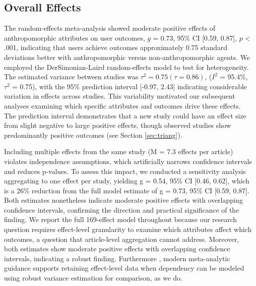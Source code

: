 \documentclass[manuscript,screen,review,anonymous]{acmart}
\DeclareRobustCommand{\change}[1]{%
    \textcolor{changeblue}{#1}%
  }
\DeclareRobustCommand{\change}[1]{#1}
\begin{document}
\subsection{Overall Effects}
The random-effects meta-analysis showed moderate positive effects of anthropomorphic attributes on user outcomes, $g$ = 0.73, 95\% CI [0.59, 0.87], $p$ < .001, indicating that users achieve outcomes approximately 0.75 standard deviations better with anthropomorphic 
versus non-anthropomorphic agents.
We employed the DerSimonian-Laird random-effects model \citep{dersimonian1986meta} to test for heterogeneity. The estimated variance between studies was $\tau^2 = 0.75 (\tau = 0.86)$, ($I^2$ = 95.4\%, $\tau^2$ = 0.75), with the 95\% prediction interval [-0.97, 2.43] indicating considerable variation in effects across studies. This variability motivated our subsequent analyses examining which specific attributes and outcomes drive these 
effects. The prediction interval demonstrates that a new study could have an effect size from slight negative to large positive effects, though observed studies show predominantly positive outcomes (see Section \ref{sec:triang}). 

\change{Including multiple effects from the same study (M = 7.3 effects per article) violates independence assumptions, which artificially narrows confidence intervals and reduces p-values. To assess this impact, we conducted a sensitivity analysis aggregating to one effect per study, yielding
g = 0.54, 95\% CI [0.46, 0.62], which is a 26\% reduction from the full model estimate of
g = 0.73, 95\% CI [0.59, 0.87]. Both estimates nonetheless indicate moderate positive effects with overlapping confidence intervals, confirming the direction and practical significance of the finding. We report the full 169-effect model throughout because our research question requires effect-level granularity to examine which attributes affect which outcomes, a question that article-level aggregation cannot address. Moreover,} both estimates show moderate positive effects with overlapping confidence intervals, indicating a robust finding. \change{Furthermore}, modern meta-analytic guidance \cite{justo_pooled_2025} supports retaining effect-level data when dependency can be modeled using robust variance estimation \cite{hedges2010} for comparison, as we do. 
\end{document}

